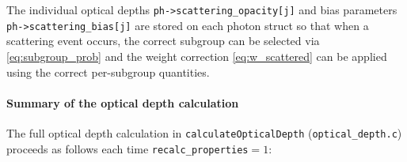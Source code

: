 \documentclass[12pt,a4paper]{article}
\newcommand{\code}[1]{\texttt{#1}}
\begin{document}
The individual optical depths \code{ph->scattering\_opacity[j]} and bias
parameters \code{ph->scattering\_bias[j]} are stored on each photon struct
so that when a scattering event occurs, the correct subgroup can be
selected via \eqref{eq:subgroup_prob} and the weight correction
\eqref{eq:w_scattered} can be applied using the correct per-subgroup
quantities.

\paragraph{Summary of the optical depth calculation}
\label{sec:tau_summary}

The full optical depth calculation in \code{calculateOpticalDepth}
(\code{optical\_depth.c}) proceeds as follows each time
\code{recalc\_properties}$=1$:
\end{document}
